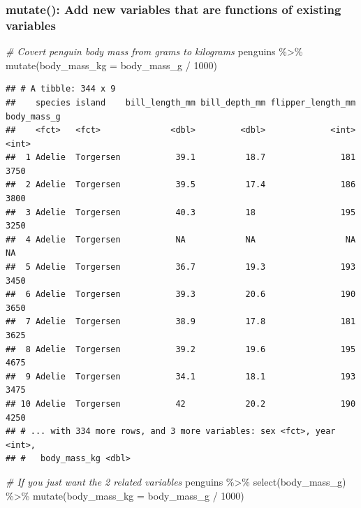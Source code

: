\documentclass[
]{article}
\newenvironment{Shaded}{\begin{snugshade}}{\end{snugshade}}
\newcommand{\AttributeTok}[1]{\textcolor[rgb]{0.77,0.63,0.00}{#1}}
\newcommand{\CommentTok}[1]{\textcolor[rgb]{0.56,0.35,0.01}{\textit{#1}}}
\newcommand{\DecValTok}[1]{\textcolor[rgb]{0.00,0.00,0.81}{#1}}
\newcommand{\FunctionTok}[1]{\textcolor[rgb]{0.00,0.00,0.00}{#1}}
\newcommand{\NormalTok}[1]{#1}
\newcommand{\SpecialCharTok}[1]{\textcolor[rgb]{0.00,0.00,0.00}{#1}}
\begin{document}
\hypertarget{mutate-add-new-variables-that-are-functions-of-existing-variables}{%
\subsubsection{mutate(): Add new variables that are functions of
existing
variables}\label{mutate-add-new-variables-that-are-functions-of-existing-variables}}

\begin{Shaded}
\begin{Highlighting}[]
\CommentTok{\# Covert penguin body mass from grams to kilograms}
\NormalTok{penguins }\SpecialCharTok{\%\textgreater{}\%} 
  \FunctionTok{mutate}\NormalTok{(}\AttributeTok{body\_mass\_kg =}\NormalTok{ body\_mass\_g }\SpecialCharTok{/} \DecValTok{1000}\NormalTok{)}
\end{Highlighting}
\end{Shaded}

\begin{verbatim}
## # A tibble: 344 x 9
##    species island    bill_length_mm bill_depth_mm flipper_length_mm body_mass_g
##    <fct>   <fct>              <dbl>         <dbl>             <int>       <int>
##  1 Adelie  Torgersen           39.1          18.7               181        3750
##  2 Adelie  Torgersen           39.5          17.4               186        3800
##  3 Adelie  Torgersen           40.3          18                 195        3250
##  4 Adelie  Torgersen           NA            NA                  NA          NA
##  5 Adelie  Torgersen           36.7          19.3               193        3450
##  6 Adelie  Torgersen           39.3          20.6               190        3650
##  7 Adelie  Torgersen           38.9          17.8               181        3625
##  8 Adelie  Torgersen           39.2          19.6               195        4675
##  9 Adelie  Torgersen           34.1          18.1               193        3475
## 10 Adelie  Torgersen           42            20.2               190        4250
## # ... with 334 more rows, and 3 more variables: sex <fct>, year <int>,
## #   body_mass_kg <dbl>
\end{verbatim}

\begin{Shaded}
\begin{Highlighting}[]
\CommentTok{\# If you just want the 2 related variables}
\NormalTok{penguins }\SpecialCharTok{\%\textgreater{}\%} 
  \FunctionTok{select}\NormalTok{(body\_mass\_g) }\SpecialCharTok{\%\textgreater{}\%} 
  \FunctionTok{mutate}\NormalTok{(}\AttributeTok{body\_mass\_kg =}\NormalTok{ body\_mass\_g }\SpecialCharTok{/} \DecValTok{1000}\NormalTok{)}
\end{Highlighting}
\end{Shaded}
\end{document}
